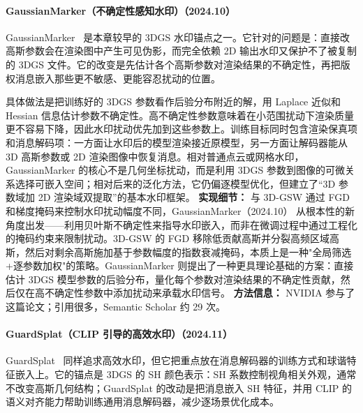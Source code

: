 \paragraph{GaussianMarker（不确定性感知水印）（2024.10）}
GaussianMarker~\cite{2410_23718} 是本章较早的 3DGS 水印锚点之一。它针对的问题是：直接改高斯参数会在渲染图中产生可见伪影，而完全依赖 2D 输出水印又保护不了被复制的 3DGS 文件。它的改变是先估计各个高斯参数对渲染结果的不确定性，再把版权消息嵌入那些更不敏感、更能容忍扰动的位置。

具体做法是把训练好的 3DGS 参数看作后验分布附近的解，用 Laplace 近似和 Hessian 信息估计参数不确定性。高不确定性参数意味着在小范围扰动下渲染质量更不容易下降，因此水印扰动优先加到这些参数上。训练目标同时包含渲染保真项和消息解码项：一方面让水印后的模型渲染接近原模型，另一方面让解码器能从 3D 高斯参数或 2D 渲染图像中恢复消息。相对普通点云或网格水印，GaussianMarker 的核心不是几何坐标扰动，而是利用 3DGS 参数到图像的可微关系选择可嵌入空间；相对后来的泛化方法，它仍偏逐模型优化，但建立了“3D 参数域加 2D 渲染域双提取”的基本水印框架。
\textbf{实现细节：} 与 3D-GSW 通过 FGD 和梯度掩码来控制水印扰动幅度不同，GaussianMarker（2024.10） 从根本性的新角度出发——利用贝叶斯不确定性来指导水印嵌入，而非在微调过程中通过工程化的掩码约束来限制扰动。3D-GSW 的 FGD 移除低贡献高斯并分裂高频区域高斯，然后对剩余高斯施加基于参数幅度的指数衰减掩码，本质上是一种"全局筛选+逐参数加权"的策略。GaussianMarker 则提出了一种更具理论基础的方案：直接估计 3DGS 模型参数的后验分布，量化每个参数对渲染结果的不确定性贡献，然后仅在高不确定性参数中添加扰动来承载水印信号。
\textbf{方法信息：} NVIDIA 参与了这篇论文；引用很多，Semantic Scholar 约 29 次。



\paragraph{GuardSplat（CLIP 引导的高效水印）（2024.11）}
GuardSplat~\cite{2411_19895} 同样追求高效水印，但它把重点放在消息解码器的训练方式和球谐特征嵌入上。它的锚点是 3DGS 的 SH 颜色表示：SH 系数控制视角相关外观，通常不改变高斯几何结构；GuardSplat 的改动是把消息嵌入 SH 特征，并用 CLIP 的语义对齐能力帮助训练通用消息解码器，减少逐场景优化成本。

